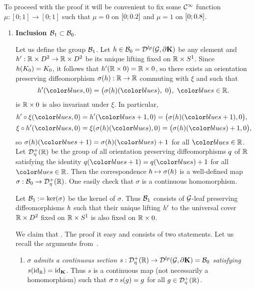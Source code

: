 To proceed with the proof it will be convenient to fix some $\mathcal{C}^{\infty}$ function $\mu:[0;1]\to[0;1]$ such that $\mu=0$ on $[0;0.2]$ and $\mu=1$ on $[0;0.8]$.


\begin{enumerate}[wide, label={\rm\arabic*)}, topsep=1ex, itemsep=1ex]

\item
{\bf Inclusion $\mathcal{B}_{ 1 }\subset\mathcal{B}_{ 0 }$}.

Let us define the group $\mathcal{B}_{ 1 }$.
Let $h\in\mathcal{B}_{ 0 } = \mathcal{D}^{lp}(\mathcal{G},\partial\mathbf{K})$ be any element and $h':\mathbb{R}\times D^2\to\mathbb{R}\times D^2$ be its unique lifting fixed on $\mathbb{R}\times S^1$.
Since $h(K_{0})=K_{0}$, it follows that $h'(\mathbb{R}\times0)=\mathbb{R}\times0$, so there exists an orientation preserving diffeomorphism $\sigma(h):\mathbb{R} \to \mathbb{R}$ commuting with $\xi$ and such that
\[
    \tdif(\as,0) = \bigl(\sigma(\dif)(\as), \ 0 \bigr), \ \as\in\bR.
\]
is $\mathbb{R}\times0$ is also invariant under $\xi$.
In particular,
\begin{align*}
    &\tdif\circ\xi(\as, 0) =\tdif(\as+1,           0) = \bigl(\sigma(\dif)(\as+1),  0 \bigr), \\
    &\xi\circ\tdif(\as, 0) =\xi(\sigma(\dif)(\as), 0) = \bigl(\sigma(\dif)(\as)+1,  0 \bigr),
\end{align*}
so $\sigma(\dif)(\as+1)=\sigma(\dif)(\as)+1$ for all $\as\in\bR$.
Let $\mathcal{D}_{\eta}^{+}(\mathbb{R})$ be the group of all orientation preserving diffeomorphisms $q$ of $\mathbb{R}$ satisfying the identity $\qdif(\as+1)=\qdif(\as)+1$ for all $\as\in\bR$.
Then the correspondence $h\mapsto \sigma(h)$ is a well-defined map $\sigma: \mathcal{B}_{ 0 } \to \mathcal{D}_{\eta}^{+}(\mathbb{R})$.
One easily check that $\sigma$ is a continuous homomorphism.

Let $\mathcal{B}_{ 1 } := \ker(\sigma)$ be the kernel of $\sigma$.
Thus $\mathcal{B}_{ 1 }$ consists of $\mathcal{G}$-leaf preserving diffeomorphisms $h$ such that their unique lifting $h'$ to the universal cover $\mathbb{R}\times D^2$ fixed on $\mathbb{R}\times S^1$ is also fixed on $\mathbb{R}\times0$.

We claim that .
The proof it easy and consists of two statements.
Let us recall the arguments from~\cite{KhokhliukMaksymenko:lens:2022}.
\begin{enumerate}[label={\rm\alph*)}, wide]
\item\label{enum:def_G1_G2:section}
\textit{$\sigma$ admits a continuous section $s:\mathcal{D}_{\eta}^{+}(\mathbb{R}) \to \mathcal{D}^{lp}(\mathcal{G},\partial\mathbf{K}) = \mathcal{B}_{ 0 }$ satisfying $s(\mathrm{id}_{\mathbb{R}})=\mathrm{id}_{\mathbf{K}}$.}
Thus $s$ is a continuous map (not necessarily a homomorphism) such that $\sigma\circ s(g) = g$ for all $g\in\mathcal{D}_{\eta}^{+}(\mathbb{R})$.


\end{enumerate}
\end{enumerate}
